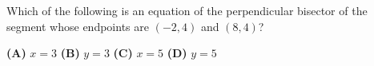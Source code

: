 Which of the following is an equation of the perpendicular bisector of the segment whose endpoints are $(-2,4)$ and $(8,4)$?

\textbf{(A)} $x=3$ \qquad \textbf{(B)} $y=3$ \qquad \textbf{(C)} $x=5$ \qquad \textbf{(D)} $y=5$
